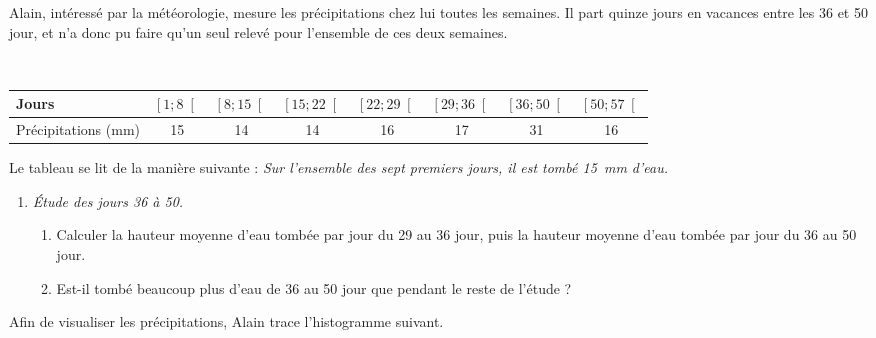 \documentclass[12pt]{article}
\begin{document}
\begin{exercice}
  Alain, intéressé par la météorologie, mesure les précipitations chez lui
  toutes les semaines. Il part quinze jours en vacances entre les 36 et 50 jour, et n'a donc pu faire qu'un seul relevé pour l'ensemble de ces deux semaines.
  
  ~

  \hspace{-2.5em}\begin{tabular}{p{2cm}||c|c|c|c|c|c|c}
    Jours &
    $\left[ 1; 8 \right[$ &
    $\left[ 8; 15 \right[$ &
    $\left[ 15; 22 \right[$ &
    $\left[ 22; 29 \right[$ &
    $\left[ 29; 36 \right[$ &
    $\left[ 36; 50 \right[$ &
    $\left[ 50; 57 \right[$ \\
    \hline
    Précipita\-tions (mm) & 15 & 14 & 14 & 16 & 17 & 31 & 16 \\
  \end{tabular}

  Le tableau se lit de la manière suivante : \emph{Sur l'ensemble des sept premiers jours, il est tombé 15~mm d'eau.}

  \begin{enumerate}
    \item \emph{Étude des jours 36 à 50.}
      \begin{enumerate}
        \item Calculer la hauteur moyenne d'eau tombée par jour du 29 au 36 jour, puis la hauteur moyenne d'eau tombée par jour du 36 au 50 jour.
        \item Est-il tombé beaucoup plus d'eau de 36 au 50 jour que pendant le reste de l'étude ?
      \end{enumerate}
  \end{enumerate}

  Afin de visualiser les précipitations, Alain trace l'histogramme suivant.


\end{exercice}
\end{document}
